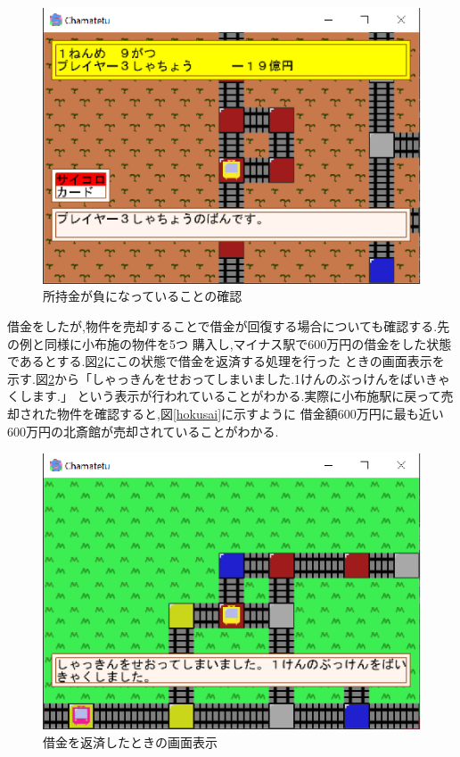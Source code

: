 \documentclass[a4j]{jarticle}
\begin{document}
    \begin{figure}[H]
        \centering
        \includegraphics[scale=1.3]{b6.eps}
        \caption{所持金が負になっていることの確認}
         \label{b6}
        \end{figure}

        借金をしたが,物件を売却することで借金が回復する場合についても確認する.先の例と同様に小布施の物件を5つ
        購入し,マイナス駅で600万円の借金をした状態であるとする.図\ref{b1}にこの状態で借金を返済する処理を行った
        ときの画面表示を示す.図\ref{b1}から「しゃっきんをせおってしまいました.1けんのぶっけんをばいきゃくします.」
        という表示が行われていることがわかる.実際に小布施駅に戻って売却された物件を確認すると,図\ref{hokusai}に示すように
        借金額600万円に最も近い600万円の北斎館が売却されていることがわかる.

        \begin{figure}[H]
            \centering
            \includegraphics[scale=1.3]{b1.eps}
            \caption{借金を返済したときの画面表示}
             \label{b1}
            \end{figure}
\end{document}
